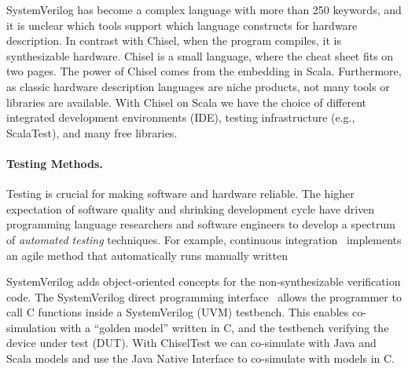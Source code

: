 \documentclass[fleqn,12pt]{article}
\begin{document}
SystemVerilog has become a complex language with more than 250 keywords, and it is unclear
which tools support which language constructs for hardware description.
In contrast with Chisel, when the program compiles, it is synthesizable hardware.
Chisel is a small language, where the cheat sheet fits on two pages.
The power of Chisel comes from the embedding in Scala.
Furthermore, as classic hardware description languages are niche products, not
many tools or libraries are available. 
With Chisel on Scala we have the choice of different integrated development environments (IDE),
testing infrastructure (e.g., ScalaTest), and many free libraries.









\paragraph{Testing Methods.}
Testing is crucial for making software and hardware reliable. The higher
expectation of software quality and shrinking development cycle have
driven programming language researchers and software engineers to
develop a spectrum of \emph{automated testing} techniques.
For example, continuous integration~\cite{duvall2007continuous} 
implements an agile method that automatically runs manually written

SystemVerilog adds object-oriented concepts for the non-synthesizable verification code.
The SystemVerilog direct programming interface~\cite{Doulos:SV:dpi} allows the programmer to call
C functions inside a SystemVerilog (UVM) testbench.
This enables co-simulation with a ``golden model'' written in C, and the
testbench verifying the device under test (DUT).
With ChiselTest we can co-simulate with Java and Scala models and use the Java Native Interface
to co-simulate with models in C.
%
\end{document}
